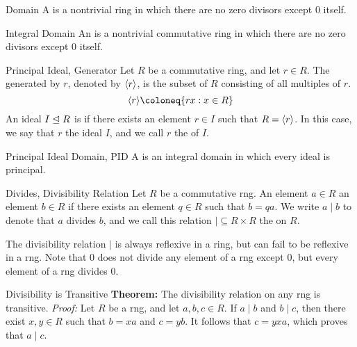 \begin{dfnbox}{Domain}
	A  is a nontrivial ring in which there are no zero divisors except $0$ itself.
\end{dfnbox}

\begin{dfnbox}{Integral Domain}
	An  is a nontrivial commutative ring in which there are no zero divisors except $0$ itself.
\end{dfnbox}

\begin{dfnbox}{Principal Ideal, Generator}
	Let $R$ be a commutative ring, and let $r \in R$. The  generated by $r$, denoted by ${\langle {r} \rangle}$, is the subset of $R$ consisting of all multiples of $r$.
	\[ \gen{r} \coloneq \{ rx : x \in R \} \]
	An ideal $I \trianglelefteq R$ is  if there exists an element $r \in I$ such that $R = {\langle {r} \rangle}$. In this case, we say that $r$  the ideal $I$, and we call $r$ the  of $I$.
\end{dfnbox}

\begin{dfnbox}{Principal Ideal Domain, PID}
	A  is an integral domain in which every ideal is principal.
\end{dfnbox}

\begin{dfnbox}{Divides, Divisibility Relation}
	Let $R$ be a commutative rng. An element $a \in R$  an element $b \in R$ if there exists an element $q \in R$ such that $b = qa$. We write $a \mid b$ to denote that $a$ divides $b$, and we call this relation ${\mid} \subseteq R \times R$ the  on $R$.
\end{dfnbox}

The divisibility relation $\mid$ is always reflexive in a ring, but can fail to be reflexive in a rng. Note that $0$ does not divide any element of a rng except $0$, but every element of a rng divides $0$.

\begin{thmbox}{Divisibility is Transitive}
	\textbf{Theorem:} The divisibility relation on any rng is transitive.
	\tcblower
	\textit{Proof:} Let $R$ be a rng, and let $a, b, c \in R$. If $a \mid b$ and $b \mid c$, then there exist $x, y \in R$ such that $b = xa$ and $c = yb$. It follows that $c = yxa$, which proves that $a \mid c$.
\end{thmbox}

